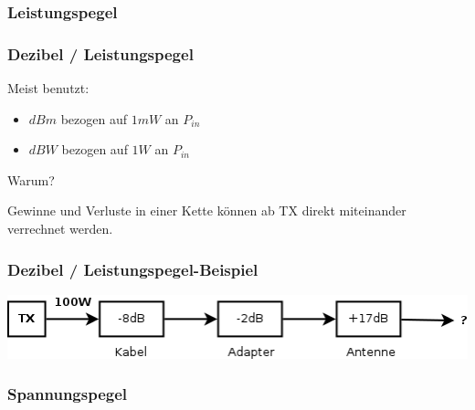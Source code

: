\subsubsection{Leistungspegel}

\begin{frame}
    \frametitle{Dezibel / Leistungspegel}

    Meist benutzt:

    \begin{itemize}
        \item $dBm$ bezogen auf $1 mW$ an $P_{in}$
        \item $dBW$ bezogen auf $1 W$ an $P_{in}$
    \end{itemize}

    \begin{center}
        Warum?
    \end{center}

    \pause

    Gewinne und Verluste in einer Kette können ab TX direkt miteinander
    verrechnet werden.

\end{frame}

\begin{frame}
    \frametitle{Dezibel / Leistungspegel-Beispiel}

    \includegraphics[width=1\textwidth]{a01/TX-Pfad}

    \vspace{3em}


\end{frame}

\subsubsection{Spannungspegel}

